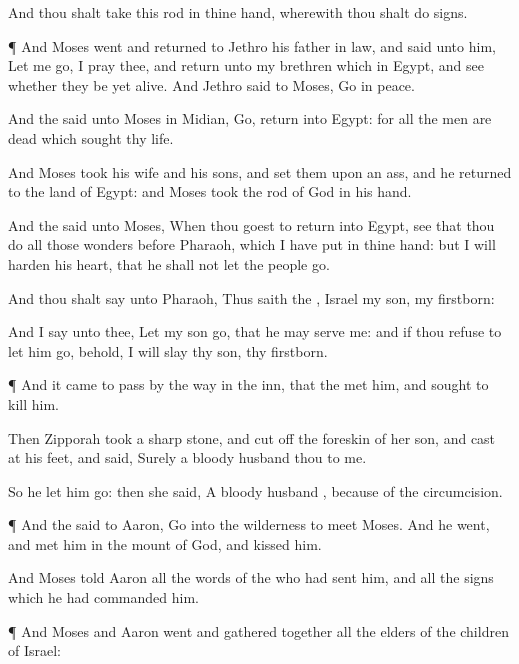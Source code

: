 {And thou shalt
take this
rod in thine
hand, wherewith thou shalt
do
signs.


\par }{\PP {}¶ And
Moses
went and
returned to
Jethro his father in
law, and
said unto him, Let me
go, I pray thee, and
return unto my
brethren which
{} in
Egypt, and
see whether they be
yet
alive. And
Jethro
said to
Moses,
Go in
peace.

And the
{}
said unto
Moses in
Midian,
Go,
return into
Egypt: for all the
men are
dead which
sought thy
life.

And
Moses
took his
wife and his
sons, and
set them upon an
ass, and he
returned to the
land of
Egypt: and
Moses
took the
rod of
God in his
hand.

And the
{}
said unto
Moses, When thou
goest to
return into
Egypt,
see that thou
do all those
wonders
before
Pharaoh, which I have
put in thine
hand: but I will
harden his
heart, that he shall not let the
people
go.

And thou shalt
say unto
Pharaoh, Thus
saith the
{},
Israel
{} my
son,
{} my
firstborn:

And I
say unto thee, Let my
son
go, that he may
serve me: and if thou
refuse to let him
go, behold, I will
slay thy
son,
{} thy
firstborn.


\par }{\PP {}¶ And it came to pass by the
way in the
inn, that the
{}
met him, and
sought to
kill him.

Then
Zipporah
took a sharp
stone, and cut
off the
foreskin of her
son, and
cast
{} at his
feet, and
said, Surely a
bloody
husband
{} thou to me.

So he let him
go: then she
said, A
bloody
husband
{}, because of the
circumcision.


\par }{\PP {}¶ And the
{}
said to
Aaron,
Go into the
wilderness to
meet
Moses. And he
went, and
met him in the
mount of
God, and
kissed him.

And
Moses
told
Aaron all the
words of the
{} who had
sent him, and all the
signs which he had
commanded him.


\par }{\PP {}¶ And
Moses and
Aaron
went and gathered
together all the
elders of the
children of
Israel:

}
